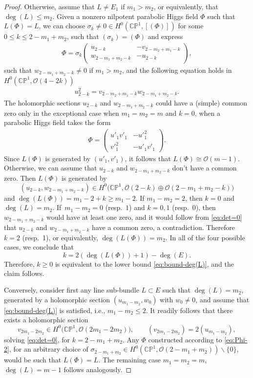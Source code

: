 \documentclass[pdftex]{sigma}
\newcommand{\field}[1]{\ensuremath{\mathbb{#1}}}
\newcommand{\CC}{\field{C}}
\newcommand{\PP}{\field{P}}
\newcommand{\calO}{\mathcal{O}}
\numberwithin{equation}{section}
\begin{document}
\begin{proof}
Otherwise, assume that $L\neq E_{1}$ if $m_{1}>m_{2}$, or equivalently, that $\deg(L)\leq m_{2}$. Given a nonzero nilpotent parabolic Higgs field $\Phi$ such that $L(\Phi)=L$, we can choose $\sigma_{k}\neq 0\in H^{0}(\CC\PP^{1},[(\Phi)])$ for some $0\leq k\leq 2-m_{1}+m_{2}$, such that $(\sigma_{k})=(\Phi)$ and express
\begin{gather}\label{eq:Phi-2}
\Phi =
\sigma_{k}\begin{pmatrix}
u_{2-k} & -v_{2-m_{2}+m_{1}-k}\\
w_{2-m_{1}+m_{2}-k} & -u_{2-k}
\end{pmatrix}\!,
\end{gather}
such that $w_{2-m_{1}+m_{2}-k}\neq 0$ if $m_{1} > m_{2}$, and the following equation holds in $H^{0}(\CC\PP^{1},\calO(4-2k))$
\begin{gather}\label{eq:det=0}
u_{2-k}^{2}=v_{2-m_{2}+m_{1}-k}w_{2-m_{1}+m_{2}-k}.
\end{gather}
The holomorphic sections $u_{2-k}$ and $w_{2-m_{1}+m_{2}-k}$ could have a (simple) common zero only in the exceptional case when $m_{1}=m_{2}=m$ and $k=0$, when a parabolic Higgs field takes the form
\begin{gather}\label{eq:Phi(m-1)}
\Phi = \begin{pmatrix}
u'_{1}v'_{1} & -u'^{2}_{1}\\
v'^{2}_{1} & -u'_{1}v'_{1}
\end{pmatrix}\!.
\end{gather}
Since
$L(\Phi)$ is generated by $(u'_{1},v'_{1})$, it follows that $L(\Phi)\cong \calO(m-1)$.
Otherwise, we can assume that $u_{2-k}$ and $w_{2-m_{1}+m_{2}-k}$ don't have a common zero. Then $L(\Phi)$ is generated by
\[
(u_{2-k},w_{2-m_{1}+m_{2}-k})\in H^{0}\bigl(\CC\PP^{1},\calO(2-k)\oplus\calO(2-m_{1}+m_{2}-k)\bigr)
\]
and $\deg(L(\Phi)) = m_{1}-2 + k\geq m_{1}-2$. If $m_{1}-m_{2}=2$, then $k=0$ and $\deg(L)=m_{2}$. If~$m_{1}-m_{2}=0$ (resp.~$1$) and $k=0,1$ (resp.~$0$), then $w_{2-m_{1}+m_{2}-k}$ would have at least one zero, and it would follow from \eqref{eq:det=0} that $u_{2-k}$ and $w_{2-m_{1}+m_{2}-k}$ have a common zero, a contradiction. Therefore $k=2$ (resp.~1), or equivalently, $\deg(L(\Phi)) = m_{2}$. In all of the four possible cases, we conclude that
\[
k= 2(\deg(L(\Phi))+1) -\deg(E).
\]
Therefore, $k \geq 0$ is equivalent to the lower bound \eqref{eq:bound-deg(L)}, and the claim follows.

Conversely, consider first any line sub-bundle $L\subset E$ such that $\deg(L)=m_{2}$, generated by a holomorphic section $(u_{m_{1}-m_{2}},w_{0})$ with $w_{0}\neq 0$, and assume that \eqref{eq:bound-deg(L)} is satisfied, i.e., $m_{1}-m_{2}\leq 2$. It readily follows that there exists a holomorphic section
\[
v_{2m_{1}-2m_{2}} \in H^{0}\bigl(\CC\PP^{1},\calO(2m_{1}-2m_{2})\bigr),\qquad
(v_{2m_{1}-2m_{2}}) = 2(u_{m_{1}-m_{2}}),
\]
solving \eqref{eq:det=0}, for $k =2-m_{1}+m_{2}$. Any $\Phi$ constructed according to \eqref{eq:Phi-2}, for an arbitrary choice of $\sigma_{2-m_{1}+m_{2}}\in H^{0}(\CC\PP^{1},\calO(2-m_{1}+m_{2}))\backslash\{0\}$, would be such that $L(\Phi)=L$. The remaining case $m_{1}=m_{2}=m$, $\deg(L)=m-1$ follows analogously.
\end{proof}
\end{document}
